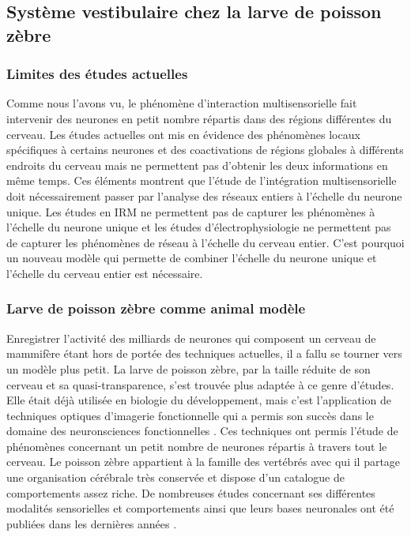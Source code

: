 
\subsection{Système vestibulaire chez la larve de poisson zèbre}

\subsubsection{Limites des études actuelles}

Comme nous l'avons vu, le phénomène d'interaction multisensorielle fait intervenir des neurones en petit nombre répartis dans des régions différentes du cerveau. Les études actuelles ont mis en évidence des phénomènes locaux spécifiques à certains neurones et des coactivations de régions globales à différents endroits du cerveau mais ne permettent pas d'obtenir les deux informations en même temps. 
Ces éléments montrent que l'étude de l'intégration multisensorielle doit nécessairement passer par l'analyse des réseaux entiers à l'échelle du neurone unique. Les études en IRM ne permettent pas de capturer les phénomènes à l'échelle du neurone unique et les études d'électrophysiologie ne permettent pas de capturer les phénomènes de réseau à l'échelle du cerveau entier. C'est pourquoi un nouveau modèle qui permette de combiner l'échelle du neurone unique et l'échelle du cerveau entier est nécessaire.

\subsubsection{Larve de poisson zèbre comme animal modèle}

Enregistrer l'activité des milliards de neurones qui composent un cerveau de mammifère étant hors de portée des techniques actuelles, il a fallu se tourner vers un modèle plus petit. La larve de poisson zèbre, par la taille réduite de son cerveau et sa quasi-transparence, s'est trouvée plus adaptée à ce genre d'études. Elle était déjà utilisée en biologie du développement, mais c'est l'application de techniques optiques d'imagerie fonctionnelle qui a permis son succès dans le domaine des neuronsciences fonctionnelles \cite{ahrens_brain-wide_2012}\cite{panier_fast_2013}\cite{ahrens_whole-brain_2013}. Ces techniques ont permis l'étude de phénomènes concernant un petit nombre de neurones répartis à travers tout le cerveau.
Le poisson zèbre appartient à la famille des vertébrés avec qui il partage une organisation cérébrale très conservée et dispose d'un catalogue de comportements assez riche. De nombreuses études concernant ses différentes modalités sensorielles et comportements ainsi que leurs bases neuronales ont été publiées dans les dernières années \cite{wolf_sensorimotor_2017}\cite{bollmann_zebrafish_2019}\cite{ehrlich_primal_2019}\cite{karpenko_behavior_2020}.


